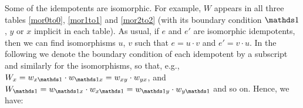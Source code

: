 \begin{table}
{{
}
}
\caption{Minimal idempotents for $\tube_{x \to x}$. 
We have used the notation $t_x =t_{x\unit xx; 11}$, $v_x = \text{id}_x \in \tube_{x \to x}$, $X_{ij} = t_{xxx; ij}$, $v_x l_y = t_{xxxy; 11}$, and $t_x h_y = t_{xyxx; 11}$. 
Where $\alpha = \frac{1}{2} \left( 1+ 1/\sqrt{2d+1} \right)$, and $\beta = \frac{1}{2} \left( 1- 1/\sqrt{2d+1} \right)$, $\gamma/\alpha =1/(2\sqrt{d} 3^{1/4})$, and $d = 1+ \sqrt{3} $. 
\label{mor1to1}}
\end{table}


Some of the idempotents are isomorphic. 
For example, $W$ appears in all three tables \ref{mor0to0}, \ref{mor1to1} and \ref{mor2to2} (with its boundary condition $\unit$, $y$ or $x$ implicit in each table).
As usual, if $e$ and $e'$ are isomorphic idempotents, then we can find isomorphisms $u$, $v$ such that $e = u\cdot v$ and $e' = v \cdot u$.
In the following we denote the boundary condition of each idempotent by a subscript and similarly for the isomorphisms, so that, e.g., $W_x = w_{x \unit} \cdot w_{\unit x} = w_{xy} \cdot w_{yx}$, and $W_{\unit} = w_{\unit x} \cdot w_{x \unit}  = w_{\unit y}\cdot w_{y \unit} $ and so on. 
Hence, we have:


